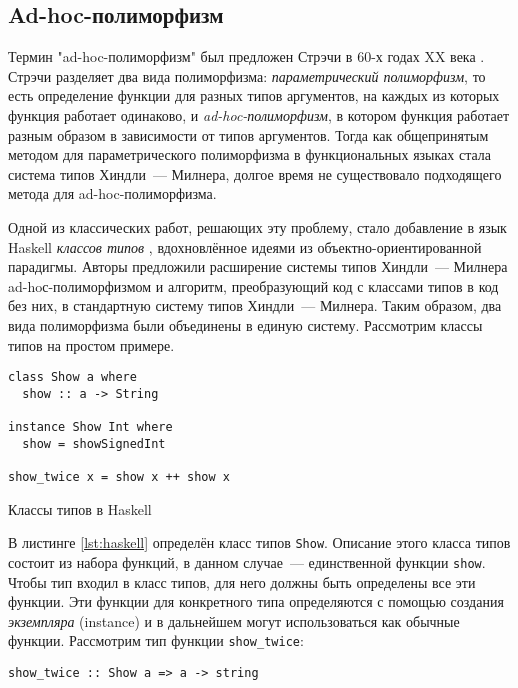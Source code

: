 \documentclass[../diploma.tex]{subfiles}
\begin{document}
\subsection{Ad-hoc-полиморфизм}

Термин "ad-hoc-полиморфизм" был предложен Стрэчи в 60-х годах XX века \cite{strachey}. Стрэчи разделяет два вида полиморфизма: \textit{параметрический полиморфизм}, то есть определение функции для разных типов аргументов, на каждых из которых функция работает одинаково, и \textit{ad-hoc-полиморфизм}, в котором функция работает разным образом в зависимости от типов аргументов. Тогда как общепринятым методом для параметрического полиморфизма в функциональных языках стала система типов Хиндли~--- Милнера, долгое время не существовало подходящего метода для ad-hoc-полиморфизма.

Одной из классических работ, решающих эту проблему, стало добавление в язык Haskell \textit{классов типов} \cite{adhoc}, вдохновлённое идеями из объектно-ориентированной парадигмы. Авторы предложили расширение системы типов Хиндли~--- Милнера ad-hoс-полиморфизмом и алгоритм, преобразующий код с классами типов в код без них, в стандартную систему типов Хиндли~--- Милнера. Таким образом, два вида полиморфизма были объединены в единую систему. Рассмотрим классы типов на простом примере.

\begin{listing}[H]
\begin{verbatim}
class Show a where
  show :: a -> String

instance Show Int where
  show = showSignedInt

show_twice x = show x ++ show x
\end{verbatim}
\caption{Классы типов в Haskell}
\label{lst:haskell}
\end{listing}

В листинге \ref{lst:haskell} определён класс типов \texttt{Show}. Описание этого класса типов состоит из набора функций, в данном случае~--- единственной функции \texttt{show}. Чтобы тип входил в класс типов, для него должны быть определены все эти функции. Эти функции для конкретного типа определяются с помощью создания \textit{экземпляра} (instance) и в дальнейшем могут использоваться как обычные функции. Рассмотрим тип функции \texttt{show\_twice}:

\begin{verbatim}
show_twice :: Show a => a -> string
\end{verbatim}
\end{document}
